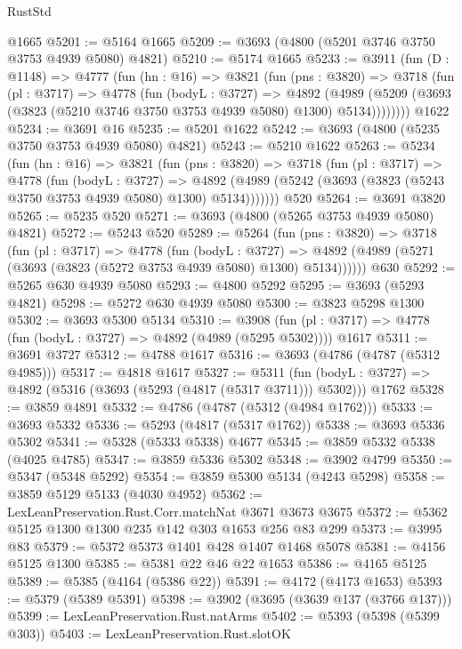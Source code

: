\begin{lexlean}{RustStd}
\begin{coremodule}
    @1665
@5201 := @5164 @1665
@5209 := @3693 (@4800 (@5201 @3746 @3750 @3753 @4939 @5080) @4821)
@5210 := @5174 @1665
@5233 := @3911
    (fun (D : @1148) =>
    @4777
      (fun (hn : @16) =>
      @3821
        (fun (pns : @3820) =>
        @3718
          (fun (pl : @3717) =>
          @4778
            (fun (bodyL : @3727) =>
            @4892
              (@4989 (@5209 (@3693 (@3823 (@5210 @3746 @3750 @3753 @4939 @5080) @1300) @5134))))))))
    @1622
@5234 := @3691 @16
@5235 := @5201 @1622
@5242 := @3693 (@4800 (@5235 @3750 @3753 @4939 @5080) @4821)
@5243 := @5210 @1622
@5263 := @5234
    (fun (hn : @16) =>
    @3821
      (fun (pns : @3820) =>
      @3718
        (fun (pl : @3717) =>
        @4778
          (fun (bodyL : @3727) =>
          @4892 (@4989 (@5242 (@3693 (@3823 (@5243 @3750 @3753 @4939 @5080) @1300) @5134)))))))
    @520
@5264 := @3691 @3820
@5265 := @5235 @520
@5271 := @3693 (@4800 (@5265 @3753 @4939 @5080) @4821)
@5272 := @5243 @520
@5289 := @5264
    (fun (pns : @3820) =>
    @3718
      (fun (pl : @3717) =>
      @4778
        (fun (bodyL : @3727) =>
        @4892 (@4989 (@5271 (@3693 (@3823 (@5272 @3753 @4939 @5080) @1300) @5134))))))
    @630
@5292 := @5265 @630 @4939 @5080
@5293 := @4800 @5292
@5295 := @3693 (@5293 @4821)
@5298 := @5272 @630 @4939 @5080
@5300 := @3823 @5298 @1300
@5302 := @3693 @5300 @5134
@5310 := @3908
    (fun (pl : @3717) => @4778 (fun (bodyL : @3727) => @4892 (@4989 (@5295 @5302))))
    @1617
@5311 := @3691 @3727
@5312 := @4788 @1617
@5316 := @3693 (@4786 (@4787 (@5312 @4985)))
@5317 := @4818 @1617
@5327 := @5311
    (fun (bodyL : @3727) => @4892 (@5316 (@3693 (@5293 (@4817 (@5317 @3711))) @5302)))
    @1762
@5328 := @3859 @4891
@5332 := @4786 (@4787 (@5312 (@4984 @1762)))
@5333 := @3693 @5332
@5336 := @5293 (@4817 (@5317 @1762))
@5338 := @3693 @5336 @5302
@5341 := @5328 (@5333 @5338) @4677
@5345 := @3859 @5332 @5338 (@4025 @4785)
@5347 := @3859 @5336 @5302
@5348 := @3902 @4799
@5350 := @5347 (@5348 @5292)
@5354 := @3859 @5300 @5134 (@4243 @5298)
@5358 := @3859 @5129 @5133 (@4030 @4952)
@5362 := LexLeanPreservation.Rust.Corr.matchNat @3671 @3673 @3675
@5372 := @5362 @5125 @1300 @1300 @235 @142 @303 @1653 @256 @83 @299
@5373 := @3995 @83
@5379 := @5372 @5373 @1401 @428 @1407 @1468 @5078
@5381 := @4156 @5125 @1300
@5385 := @5381 @22 @46 @22 @1653
@5386 := @4165 @5125
@5389 := @5385 (@4164 (@5386 @22))
@5391 := @4172 (@4173 @1653)
@5393 := @5379 (@5389 @5391)
@5398 := @3902 (@3695 (@3639 @137 (@3766 @137)))
@5399 := LexLeanPreservation.Rust.natArms
@5402 := @5393 (@5398 (@5399 @303))
@5403 := LexLeanPreservation.Rust.slotOK

\end{coremodule}
\end{lexlean}
